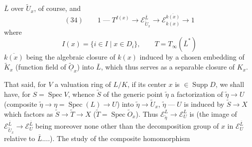 $\bar L$ over $\tilde U_x$, of course, and
\[
 (34)\qquad
 1\mathrel{\text{---}}T^{I(x)}\longrightarrow
 \mathcal E_{\tilde U_x}^{\bar L}\longrightarrow
 \mathcal E_{k(x)}^{\overline{k(x)}}\longrightarrow 1
\]
where 
\[
 I(x)=\{i\in I\mid x\in D_i\},\qquad T=T_\infty(\bar L^*)
\]
$\overline{k(x)}$ being the algebraic closure of $k(x)$ induced by a chosen embedding of $\tilde K_x$ (function field of $\widetilde{\underline{O}}_x$) into $\bar L$, which thus serves  as a separable closure of $K_x$.

That said, for $V$ a valuation ring of $L/K$, if its center $x$  is $\in\operatorname{Supp}D$, we shall have, for $S=\operatorname{Spec}V$, whence $\tilde S$  of the generic point $\tilde\eta$ a factorization of $\tilde\eta\longrightarrow U$ (composite $\tilde\eta\longrightarrow\eta=\operatorname{Spec}(L)\longrightarrow U$) into $\tilde\eta\longrightarrow\tilde U_x$,  $\tilde\eta\mathrel{\text{---}}U$ is induced by $\tilde S\longrightarrow X$ which factors as $\tilde S\longrightarrow\tilde T\longrightarrow X$ ($\tilde T=\operatorname{Spec}\tilde O_x$). Thus   $\mathcal E_{\tilde\eta}^{L}\longrightarrow\mathcal E_U^{L}$ is  
(the image of $\mathcal E_{\tilde U_x}^{\bar L}\longrightarrow\mathcal E_U^{\bar L}$ being moreover none other than the decomposition group of $x$ in $\mathcal E_U^{\bar L}$ relative to $\bar L$....). The study of the composite homomorphism
